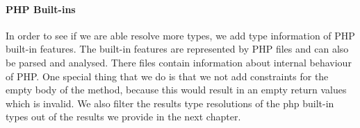 \documentclass[../main.tex]{subfiles}
\begin{document}
    \paragraph{PHP Built-ins}
    In order to see if we are able resolve more types, we add type information of PHP built-in features.
    The built-in features are represented by PHP files and can also be parsed and analysed.
    There files contain information about internal behaviour of PHP.
    One special thing that we do is that we not add constraints for the empty body of the method, because this would result in an empty return values which is invalid.
    We also filter the results type resolutions of the php built-in types out of the results we provide in the next chapter.
\end{document}
